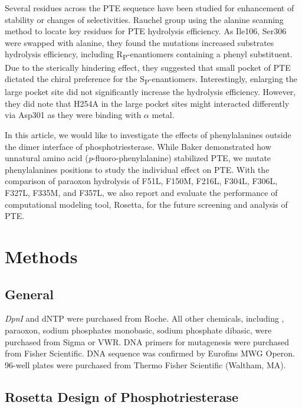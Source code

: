 \begin{refsection}
Several residues across the PTE sequence have been studied for enhancement of
stability \cite{Baker2011b,Yang2014a} or changes of
selectivities\cite{Bigley2013b,Chen-Goodspeed2001a,Pavelka2009}. Rauchel group
using the alanine scanning method to locate key residues for PTE hydrolysis
efficiency\cite{Chen-Goodspeed2001a}. As Ile106, Ser306 were swapped with
alanine, they found the mutations increased substrates hydrolysis
efficiency, including R\textsubscript{P}-enantiomers containing a phenyl
substituent. Due to the sterically hindering effect, they suggested that small
pocket of PTE dictated the chiral preference for the
S\textsubscript{P}-enantiomers. Interestingly, enlarging the large pocket site
did not significantly increase the hydrolysis efficiency. However, they did
note that H254A in the large pocket sites might interacted differently via
Asp301 as they were binding with $\alpha$ metal. 

In this article, we would like to investigate the effects of phenylalanines
outside the dimer interface of phosphotriesterase. While Baker 
demonstrated how unnatural amino acid (\emph{p}-fluoro-phenylalanine)
stabilized PTE, we mutate phenylalanines positions to study the individual
effect on PTE. With the comparison of paraoxon hydrolysis of F51L, F150M,
F216L, F304L, F306L, F327L, F335M, and F357L, we also report and evaluate the
performance of computational modeling tool, Rosetta, for the future screening
and analysis of PTE.

\section{Methods}

\subsection{General}

\emph{DpnI} and dNTP were purchased from Roche. All other chemicals, including
, paraoxon, sodium phosphates monobasic, sodium phosphate dibasic, were
purchased from Sigma or VWR. DNA primers for mutagenesis were purchased from
Fisher Scientific. DNA sequence was confirmed by Eurofins MWG Operon.  96-well
plates were purchased from Thermo Fisher Scientific (Waltham,
MA)\cite{Yang2014a}.

\subsection{Rosetta Design of Phosphotriesterase}


\end{refsection}
